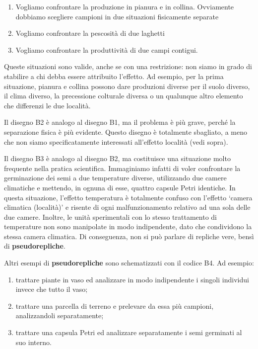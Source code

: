 \documentclass[a4paper,12pt,oneside]{book}
\providecommand{\tightlist}{%
  \setlength{\itemsep}{0pt}\setlength{\parskip}{0pt}}
\theoremstyle{definition}
\theoremstyle{definition}
\theoremstyle{definition}
\theoremstyle{remark}
\begin{document}
\begin{enumerate}
\def\labelenumi{\arabic{enumi}.}
\tightlist
\item
  Vogliamo confrontare la produzione in pianura e in collina. Ovviamente
  dobbiamo scegliere campioni in due situazioni fisicamente separate
\item
  Vogliamo confrontare la pescosità di due laghetti
\item
  Vogliamo confrontare la produttività di due campi contigui.
\end{enumerate}

Queste situazioni sono valide, anche se con una restrizione: non siamo
in grado di stabilire a chi debba essere attribuito l'effetto. Ad
esempio, per la prima situazione, pianura e collina possono dare
produzioni diverse per il suolo diverso, il clima diverso, la
precessione colturale diversa o un qualunque altro elemento che
differenzi le due località.

Il disegno B2 è analogo al disegno B1, ma il problema è più grave,
perché la separazione fisica è più evidente. Questo disegno è totalmente
sbagliato, a meno che non siamo specificatamente interessati all'effetto
località (vedi sopra).

Il disegno B3 è analogo al disegno B2, ma costituisce una situazione
molto frequente nella pratica scientifica. Immaginiamo infatti di voler
confrontare la germinazione dei semi a due temperature diverse,
utilizzando due camere climatiche e mettendo, in ognuna di esse, quattro
capsule Petri identiche. In questa situazione, l'effetto temperatura è
totalmente confuso con l'effetto `camera climatica (località)' e risente
di ogni malfunzionamento relativo ad una sola delle due camere. Inoltre,
le unità sperimentali con lo stesso trattamento di temperature non sono
manipolate in modo indipendente, dato che condividono la stessa camera
climatica. Di conseguenza, non si può parlare di repliche vere, bensì di
\textbf{pseudorepliche}.

Altri esempi di \textbf{pseudorepliche} sono schematizzati con il codice
B4. Ad esempio:

\begin{enumerate}
\def\labelenumi{\arabic{enumi}.}
\tightlist
\item
  trattare piante in vaso ed analizzare in modo indipendente i singoli
  individui invece che tutto il vaso;
\item
  trattare una parcella di terreno e prelevare da essa più campioni,
  analizzandoli separatamente;
\item
  trattare una capsula Petri ed analizzare separatamente i semi
  germinati al suo interno.
\end{enumerate}
\end{document}
